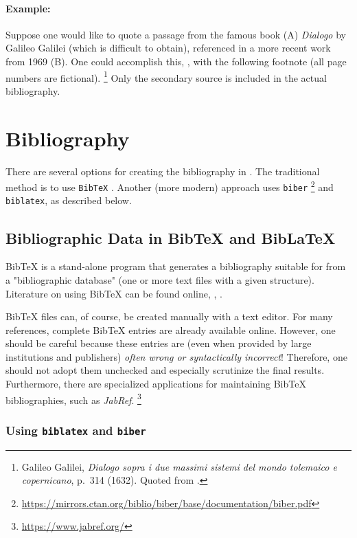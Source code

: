\paragraph{Example:} Suppose one would like to quote a passage from the famous
book (\textrm{A}) \emph{Dialogo} by Galileo Galilei (which is difficult to obtain),
referenced in a more recent work from 1969 (\textrm{B}). One could accomplish this,
\eg, with the following footnote (all page numbers are fictional).%
\footnote{Galileo Galilei, \emph{Dialogo sopra i due massimi sistemi del
mondo tolemaico e copernicano}, p.~314 (1632). Quoted from 
\cite[p.~59]{Hemleben1969}.}
Only the secondary source \cite{Hemleben1969} is included in the actual bibliography.


\section{Bibliography}

There are several options for creating the bibliography in \latex. The
traditional method is to use \texttt{BibTeX} \cite{Patashnik1988}. Another (more
modern) approach uses \texttt{biber}%
\footnote{\url{https://mirrors.ctan.org/biblio/biber/base/documentation/biber.pdf}}
and \texttt{biblatex}, as described below.


\subsection{Bibliographic Data in BibTeX and BibLaTeX}
\label{sec:bibtex}

BibTeX is a stand-alone program that generates a bibliography suitable for
\latex from a "bibliographic database" (one or more text files with a given
structure). Literature on using BibTeX can be found online, \eg,
\cite{Feder2006, Patashnik1988}.

BibTeX files can, of course, be created manually with a text editor. For many
references, complete BibTeX entries are already available online. However, one
should be careful because these entries are (even when provided by large
institutions and publishers) \emph{often wrong or syntactically incorrect}!
Therefore, one should not adopt them unchecked and especially scrutinize the
final results. Furthermore, there are specialized applications for maintaining
BibTeX bibliographies, such as \emph{JabRef}.%
\footnote{\url{https://www.jabref.org/}}

\subsubsection{Using \texttt{biblatex} and \texttt{biber}}

